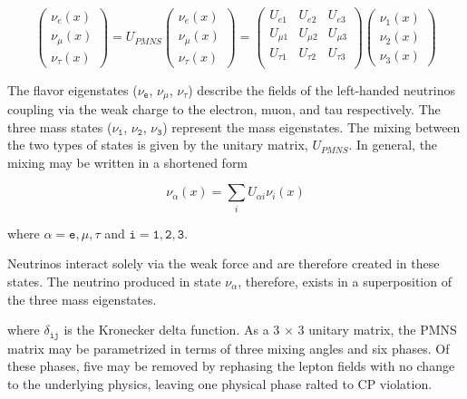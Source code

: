 \begin{equation}
\begin{pmatrix} \nu_e\left(x\right) \\ 	\nu_\mu\left(x\right) \\	\nu_\tau\left(x\right) \end{pmatrix} = 
U_{PMNS} \begin{pmatrix} \nu_e\left(x\right) \\ 	\nu_\mu\left(x\right) \\	\nu_\tau\left(x\right) \end{pmatrix} = 
\begin{pmatrix}
 U_{e 1} & U_{e 2} & U_{e 3} \\
 U_{\mu 1} & U_{\mu 2} & U_{\mu 3} \\
 U_{\tau 1} & U_{\tau 2} & U_{\tau 3} \\
\end{pmatrix} 	
\begin{pmatrix} \nu_1\left(x\right) \\ 	\nu_2\left(x\right) \\	\nu_3\left(x\right) \end{pmatrix}
\label{eqn:3flavor_pmns}
\end{equation}

The flavor eigenstates ($\mathtt{\nu_e}$, $\mathtt{\nu_\mu}$, $\mathtt{\nu_\tau}$) describe the fields of the left-handed neutrinos coupling via the weak charge to the electron, muon, and tau respectively.
The three mass states ($\mathtt{\nu_1}$, $\mathtt{\nu_2}$, $\mathtt{\nu_3}$) represent the mass eigenstates.
The mixing between the two types of states is given by the unitary matrix, $U_{PMNS}$.
In general, the mixing may be written in a shortened form

\begin{equation}
\nu_{\alpha}\left(x\right) = \sum_i U_{\alpha i} \nu_{i}\left(x\right)
\label{eqn:3flavor_short}
\end{equation}

where $\mathtt{\alpha=e,\mu,\tau}$ and $\mathtt{i=1,2,3}$. 

Neutrinos interact solely via the weak force and are therefore created in these states.
The neutrino produced in state $\nu_\alpha$, therefore, exists in a superposition of the three mass eigenstates.

where $\mathtt{\delta_{ij}}$ is the Kronecker delta function.
As a 3 $\mathtt{\times}$ 3 unitary matrix, the PMNS matrix may be parametrized in terms of three mixing angles and six phases.
Of these phases, five may be removed by rephasing the lepton fields with no change to the underlying physics, leaving one physical phase ralted to CP violation.

